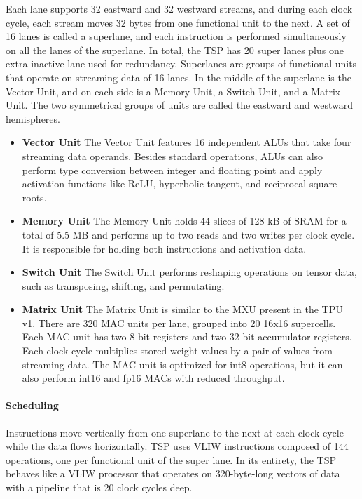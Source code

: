 \documentclass[conference]{IEEEtran}
\begin{document}
Each lane supports 32 eastward and 32 westward streams, and during each clock cycle, each stream moves 32 bytes from one functional unit to the next. A set of 16 lanes is called a superlane, and each instruction is performed simultaneously on all the lanes of the superlane. In total, the TSP has 20 super lanes plus one extra inactive lane used for redundancy.
Superlanes are groups of functional units that operate on streaming data of 16 lanes. In the middle of the superlane is the Vector Unit, and on each side is a Memory Unit, a Switch Unit, and a Matrix Unit. The two symmetrical groups of units are called the eastward and westward hemispheres.
\begin{itemize}
    \item \textbf{Vector Unit} The Vector Unit features 16 independent ALUs that take four streaming data operands. Besides standard operations, ALUs can also perform type conversion between integer and floating point and apply activation functions like ReLU, hyperbolic tangent, and reciprocal square roots.
    \item \textbf{Memory Unit} The Memory Unit holds 44 slices of 128 kB of SRAM for a total of 5.5 MB and performs up to two reads and two writes per clock cycle. It is responsible for holding both instructions and activation data.
    \item \textbf{Switch Unit} The Switch Unit performs reshaping operations on tensor data, such as transposing, shifting, and permutating.
    \item \textbf{Matrix Unit} The Matrix Unit is similar to the MXU present in the TPU v1. There are 320 MAC units per lane, grouped into 20 16x16 supercells. Each MAC unit has two 8-bit registers and two 32-bit accumulator registers. Each clock cycle multiplies stored weight values by a pair of values from streaming data. The MAC unit is optimized for int8 operations, but it can also perform int16 and fp16 MACs with reduced throughput.
\end{itemize}
\paragraph{Scheduling}
Instructions move vertically from one superlane to the next at each clock cycle while the data flows horizontally. TSP uses VLIW instructions composed of 144 operations, one per functional unit of the super lane. In its entirety, the TSP behaves like a VLIW processor that operates on 320-byte-long vectors of data with a pipeline that is 20 clock cycles deep.
\end{document}
